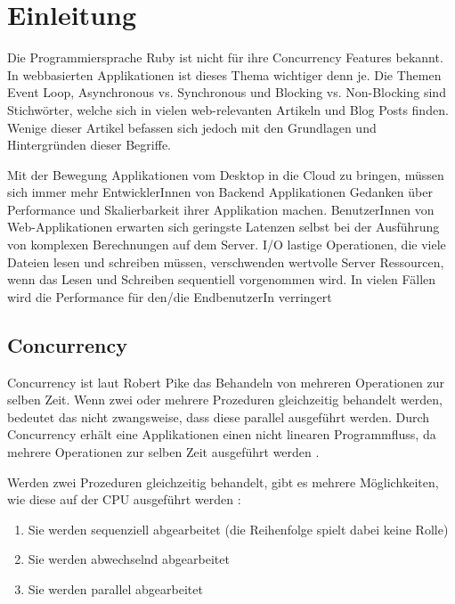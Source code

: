 \section{Einleitung}
\label{section:Einleitung}

Die Programmiersprache Ruby ist nicht für ihre Concurrency Features bekannt. In webbasierten Applikationen ist dieses Thema wichtiger denn je. Die Themen Event Loop, Asynchronous vs. Synchronous und Blocking vs. Non-Blocking sind Stichwörter, welche sich in vielen web-relevanten Artikeln und Blog Posts finden. Wenige dieser Artikel befassen sich jedoch mit den Grundlagen und Hintergründen dieser Begriffe. 

Mit der Bewegung Applikationen vom Desktop in die Cloud zu bringen, müssen sich immer mehr EntwicklerInnen von Backend Applikationen Gedanken über Performance und Skalierbarkeit ihrer Applikation machen. BenutzerInnen von Web-Applikationen erwarten sich geringste Latenzen selbst bei der Ausführung von komplexen Berechnungen auf dem Server. I/O lastige Operationen, die viele Dateien lesen und schreiben müssen, verschwenden wertvolle Server Ressourcen, wenn das Lesen und Schreiben sequentiell vorgenommen wird. In vielen Fällen wird  die Performance für den/die EndbenutzerIn verringert

\subsection{Concurrency}
\label{section:concurrency}

Concurrency ist laut Robert Pike das Behandeln von mehreren Operationen zur selben Zeit. Wenn zwei oder mehrere Prozeduren gleichzeitig behandelt werden, bedeutet das nicht zwangsweise, dass diese parallel ausgeführt werden. Durch Concurrency erhält eine Applikationen einen nicht linearen Programmfluss, da mehrere Operationen zur selben Zeit ausgeführt werden \cite[]{Pik2013}.

Werden zwei Prozeduren gleichzeitig behandelt, gibt es mehrere Möglichkeiten, wie diese auf der CPU ausgeführt werden \cite[p. 14]{Erb2012}:

\begin{enumerate}
  \item Sie werden sequenziell abgearbeitet (die Reihenfolge spielt dabei keine Rolle)
  \item Sie werden abwechselnd abgearbeitet
  \item Sie werden parallel abgearbeitet
\end{enumerate}

